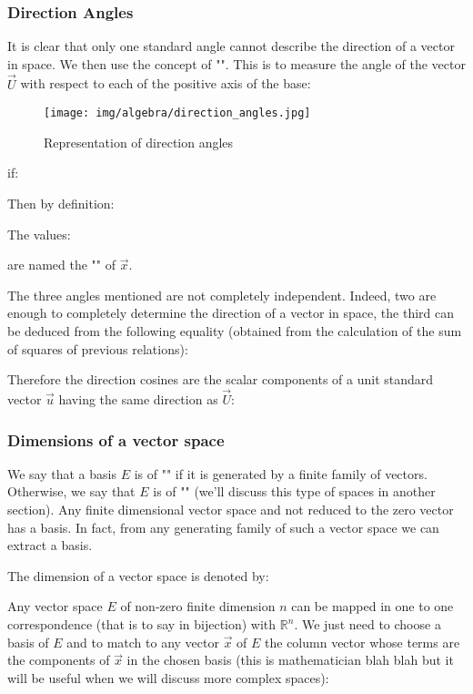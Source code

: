 	\pagebreak
	\subsubsection{Direction Angles}
	It is clear that only one standard angle cannot describe the direction of a vector in space. We then use the concept of "". This is to measure the angle of the vector $\vec{U}$ with respect to each of the positive axis of the base:
	\begin{figure}[H]
		\centering
		\texttt{[image: img/algebra/direction\_angles.jpg]}
		\caption{Representation of direction angles}
	\end{figure}
	if:
	
	Then by definition:
	
	The values:
	
	are named the "\label{cosines directions}" of $\vec{x}$.
	
	The three angles mentioned are not completely independent. Indeed, two are enough to completely determine the direction of a vector in space, the third can be deduced from the following equality (obtained from the calculation of the sum of squares of previous relations):
	
	Therefore the direction cosines are the scalar components of a unit standard vector  $\vec{u}$ having the same direction as $\vec{U}$:
	
	
	\subsubsection{Dimensions of a vector space}
	We say that a basis $E$ is of "" if it is generated by a finite family of vectors. Otherwise, we say that $E$ is of "" (we'll discuss this type of spaces in another section). Any finite dimensional vector space and not reduced to the zero vector has a basis. In fact, from any generating family of such a vector space we can extract a basis.
	
	The dimension of a vector space is denoted by:
	
	Any vector space $E$ of non-zero finite dimension $n$ can be mapped in one to one correspondence (that is to say in bijection) with $\mathbb{R}^n$. We just need to choose a basis of $E$ and to match to any vector $\vec{x}$ of $E$ the column vector whose terms are the components of $\vec{x}$ in the chosen basis (this is  mathematician blah blah but it will be useful when we will discuss more complex spaces):
	
